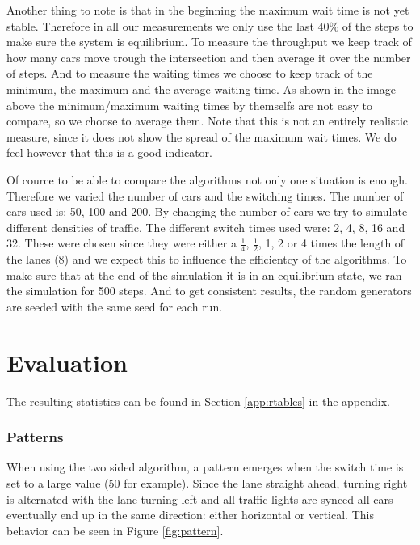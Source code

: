 \documentclass[a4paper,11pt]{article}
\begin{document}
Another thing to note is that in the beginning the maximum wait time is not yet stable.
Therefore in all our measurements we only use the last $40\%$ of the steps to make sure the system is equilibrium.
To measure the throughput we keep track of how many cars move trough the intersection and then average it over the number of steps.
And to measure the waiting times we choose to keep track of the minimum, the maximum and the average waiting time.
As shown in the image above the minimum/maximum waiting times by themselfs are not easy to compare, so we choose to average them.
Note that this is not an entirely realistic measure, since it does not show the spread of the maximum wait times.
We do feel however that this is a good indicator.


Of cource to be able to compare the algorithms not only one situation is enough.
Therefore we varied the number of cars and the switching times.
The number of cars used is: 50, 100 and 200.
By changing the number of cars we try to simulate different densities of traffic.
The different switch times used were: 2, 4, 8, 16 and 32.
These were chosen since they were either a $\frac{1}{4}$, $\frac{1}{2}$, 1, 2 or 4 times the length of the lanes (8) and we expect this to influence the efficientcy of the algorithms.
To make sure that at the end of the simulation it is in an equilibrium state, we ran the simulation for 500 steps.
And to get consistent results, the random generators are seeded with the same seed for each run.

\section{Evaluation}\label{sec:eval}

The resulting statistics can be found in Section \ref{app:rtables} in the appendix.


\subsubsection*{Patterns}
When using the two sided algorithm, a pattern emerges when the switch time is set to a large value (50 for example).
Since the lane straight ahead, turning right is alternated with the lane turning left and all traffic lights are
synced all cars eventually end up in the same direction: either horizontal or vertical.
This behavior can be seen in Figure \ref{fig:pattern}.
\end{document}
